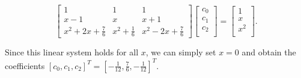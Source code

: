 \documentclass[11pt]{article}
\begin{document}
\begin{equation}
    \label{eq-Matrix}
    \left[
        \begin{array}{ccc}
            1 & 1 & 1\\
            x-1& x & x+1 \\
            x^2+2x+\frac{7}{6} & x^2 + \frac{1}{6} & x^2-2x+\frac{7}{6}
        \end{array}
    \right]
    \left[
        \begin{array}{c}
            c_0 \\
            c_1 \\
            c_2 \\
        \end{array}
    \right]
    = 
    \left[
        \begin{array}{c}
            1 \\
            x \\ 
            x^2 \\
        \end{array}
    \right].
\end{equation}

Since this linear system holds for all \(x\), we can simply set \(x=0\)
and obtain the coefficients
\([c_0, c_1, c_2]^{T} = [ -\frac{1}{12}, \frac{7}{6}, -\frac{1}{12}]^T\).
\end{document}
